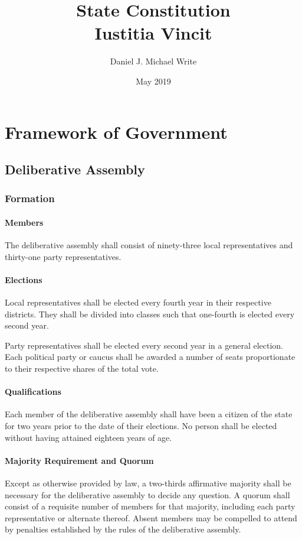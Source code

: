 \documentclass{article}
\title{State Constitution \\ Iustitia Vincit}
\date{May 2019}
\author{Daniel J. Michael Write}
\begin{document}
\maketitle
\newpage
\tableofcontents
\newpage
\section{Framework of Government}
\subsection{Deliberative Assembly}
\subsubsection{Formation}
\paragraph{Members}
The deliberative assembly shall consist of ninety-three local representatives and thirty-one party representatives.
\paragraph{Elections}
Local representatives shall be elected every fourth year in their respective districts. They shall be divided into classes such that one-fourth is elected every second year.

Party representatives shall be elected every second year in a general election. Each political party or caucus shall be awarded a number of seats proportionate to their respective shares of the total vote.
\paragraph{Qualifications}
Each member of the deliberative assembly shall have been a citizen of the state for two years prior to the date of their elections. No person shall be elected without having attained eighteen years of age.
\paragraph{Majority Requirement and Quorum}
Except as otherwise provided by law, a two-thirds affirmative majority shall be necessary for the deliberative assembly to decide any question. A quorum shall consist of a requisite number of members for that majority, including each party representative or alternate thereof. Absent members may be compelled to attend by penalties established by the rules of the deliberative assembly.
\end{document}
